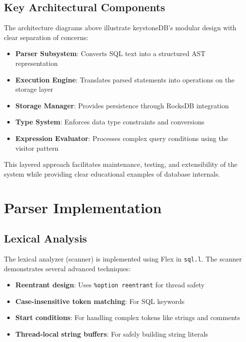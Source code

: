 \documentclass[12pt,a4paper]{article}
\begin{document}
\clearpage %

\subsection{Key Architectural Components}
The architecture diagrams above illustrate keystoneDB's modular design with clear separation of concerns:

\begin{itemize}
    \item \textbf{Parser Subsystem}: Converts SQL text into a structured AST representation
    \item \textbf{Execution Engine}: Translates parsed statements into operations on the storage layer
    \item \textbf{Storage Manager}: Provides persistence through RocksDB integration
    \item \textbf{Type System}: Enforces data type constraints and conversions
    \item \textbf{Expression Evaluator}: Processes complex query conditions using the visitor pattern
\end{itemize}

This layered approach facilitates maintenance, testing, and extensibility of the system while providing clear educational examples of database internals.

\section{Parser Implementation}
\subsection{Lexical Analysis}
The lexical analyzer (scanner) is implemented using Flex in \texttt{sql.l}. The scanner demonstrates several advanced techniques:

\begin{itemize}
    \item \textbf{Reentrant design}: Uses \texttt{\%option reentrant} for thread safety
    \item \textbf{Case-insensitive token matching}: For SQL keywords
    \item \textbf{Start conditions}: For handling complex tokens like strings and comments
    \item \textbf{Thread-local string buffers}: For safely building string literals
\end{itemize}
\end{document}
